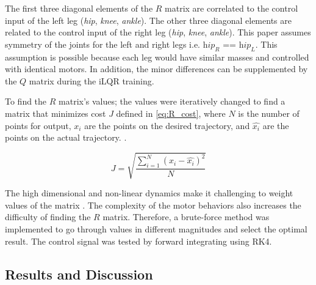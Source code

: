The first three diagonal elements of the $R$ matrix are correlated to the control input of the left leg (\textit{hip}, \textit{knee}, \textit{ankle}). The other three diagonal elements are related to the control input of the right leg (\textit{hip}, \textit{knee}, \textit{ankle}). This paper assumes symmetry of the joints for the left and right legs i.e. $\textit{hip}_R$ == $\textit{hip}_L$.  This assumption is possible because each leg would have similar masses and controlled with identical motors. In addition, the minor differences can be supplemented by the $Q$ matrix during the iLQR training.  

To find the $R$ matrix's values; the values were iteratively changed to find a matrix that minimizes cost $J$ defined in \autoref{eq:R_cost}, where $N$ is the number of points for output, $x_i$ are the points on the desired trajectory, and $\hat{x_i}$ are the points on the actual trajectory. 
 \cite{chai2014root}.

\begin{equation}
    J = \sqrt{\frac{\sum_{i=1}^N(x_i-\hat{x_i})^2}{N}}
    \label{eq:R_cost}
\end{equation}

The high dimensional and non-linear dynamics make it challenging to weight values of the matrix \cite{park2012multi}. The complexity of the motor behaviors also increases the difficulty of finding the $R$ matrix. Therefore, a brute-force method was implemented to go through values in different magnitudes and select the optimal result. The control signal was tested by forward integrating using RK4.  




\subsection{Results and Discussion}



